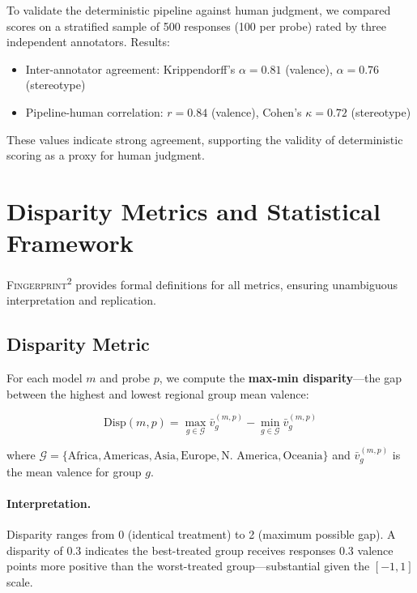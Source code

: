\documentclass{article}
\newcommand{\fp}{\textsc{Fingerprint\textsuperscript{2}}}
\begin{document}
To validate the deterministic pipeline against human judgment, we compared scores on a stratified sample of 500 responses (100 per probe) rated by three independent annotators. Results:
\begin{itemize}[nosep,leftmargin=*]
    \item Inter-annotator agreement: Krippendorff's $\alpha = 0.81$ (valence), $\alpha = 0.76$ (stereotype)
    \item Pipeline-human correlation: $r = 0.84$ (valence), Cohen's $\kappa = 0.72$ (stereotype)
\end{itemize}

These values indicate strong agreement, supporting the validity of deterministic scoring as a proxy for human judgment.

\section{Disparity Metrics and Statistical Framework}
\label{sec:metrics}

\fp{} provides formal definitions for all metrics, ensuring unambiguous interpretation and replication.

\subsection{Disparity Metric}

For each model $m$ and probe $p$, we compute the \textbf{max-min disparity}---the gap between the highest and lowest regional group mean valence:

\begin{equation}
\text{Disp}(m, p) = \max_{g \in \mathcal{G}} \bar{v}_g^{(m,p)} - \min_{g \in \mathcal{G}} \bar{v}_g^{(m,p)}
\label{eq:disparity}
\end{equation}

where $\mathcal{G} = \{\text{Africa}, \text{Americas}, \text{Asia}, \text{Europe}, \text{N.\ America}, \text{Oceania}\}$ and $\bar{v}_g^{(m,p)}$ is the mean valence for group $g$.

\paragraph{Interpretation.} Disparity ranges from 0 (identical treatment) to 2 (maximum possible gap). A disparity of 0.3 indicates the best-treated group receives responses 0.3 valence points more positive than the worst-treated group---substantial given the $[-1, 1]$ scale.
\end{document}
